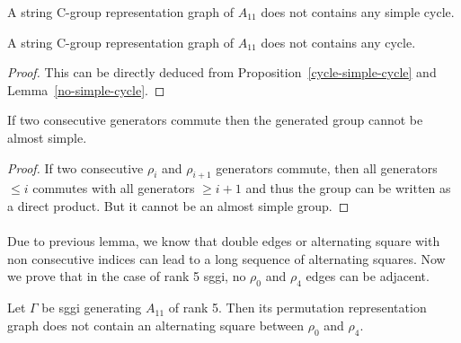 \begin{lemma}
  \label{no-simple-cycle}
  A string C-group representation graph of $A_{11}$ does not contains any simple cycle.
\end{lemma}

\begin{corollary}
  \label{no-cycle}
  A string C-group representation graph of $A_{11}$ does not contains any cycle.
\end{corollary}

\begin{proof}
  This can be directly deduced from Proposition~\ref{cycle-simple-cycle} and Lemma~\ref{no-simple-cycle}.
\end{proof}

\begin{proposition}
  \label{adjacent-must-not-commute}
  If two consecutive generators commute then the generated group cannot be almost simple.
\end{proposition}

\begin{proof}
  If two consecutive $\rho_i$ and $\rho_{i+1}$ generators commute, then all generators $\le i$ commutes with all generators $\ge i+1$ and thus the group can be written as a direct product. But it cannot be an almost simple group.
\end{proof}

\paragraph{}
Due to previous lemma, we know that double edges or alternating square with non consecutive indices can lead to a long sequence of alternating squares. Now we prove that in the case of rank 5 sggi, no $\rho_0$ and $\rho_4$ edges can be adjacent.

\begin{lemma}
  \label{lemma-forbidden-alternating-square}
  Let $\Gamma$ be sggi generating $A_{11}$ of rank 5. Then its permutation representation graph does not contain an alternating square between $\rho_0$ and $\rho_4$.
\end{lemma}

